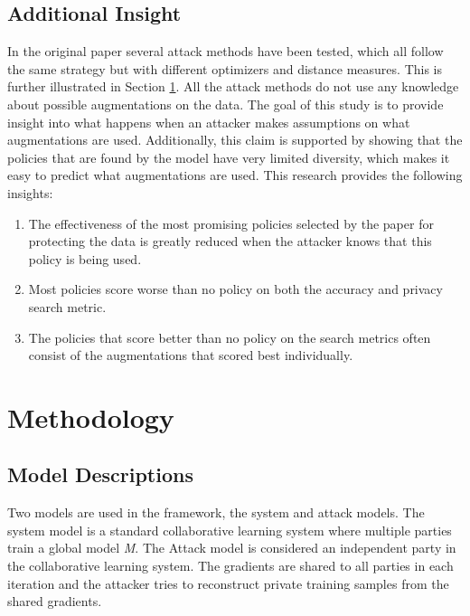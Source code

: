 \subsection{Additional Insight}
In the original paper several attack methods have been tested, which all follow the same strategy but with different optimizers and distance measures. This is further illustrated in Section \ref{sec:method}. All the attack methods do not use any knowledge about possible augmentations on the data. The goal of this study is to provide insight into what happens when an attacker makes assumptions on what augmentations are used. Additionally, this claim is supported by showing that the policies that are found by the model have very limited diversity, which makes it easy to predict what augmentations are used. This research provides the following insights:
\begin{enumerate}
    \item The effectiveness of the most promising policies selected by the paper for protecting the data is greatly reduced when the attacker knows that this policy is being used.
    \item Most policies score worse than no policy on both the accuracy and privacy search metric.
    \item The policies that score better than no policy on the search metrics often consist of the augmentations that scored best individually.
\end{enumerate}


\section{Methodology} \label{sec:method}

\subsection{Model Descriptions}
Two models are used in the framework, the system and attack models. The system model is a standard collaborative learning system where multiple parties train a global model \textit{M}. The Attack model is considered an independent party in the collaborative learning system. The gradients are shared to all parties in each iteration and the attacker tries to reconstruct private training samples from the shared gradients.

